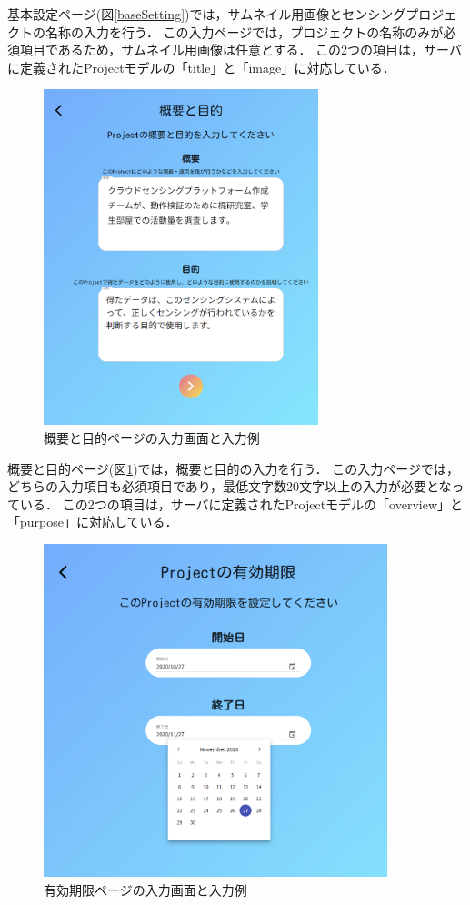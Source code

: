 基本設定ページ(図\ref{baseSetting})では，サムネイル用画像とセンシングプロジェクトの名称の入力を行う．
この入力ページでは，プロジェクトの名称のみが必須項目であるため，サムネイル用画像は任意とする．
この2つの項目は，サーバに定義されたProjectモデルの「title」と「image」に対応している．
\begin{figure}[H]
  \centering
  \includegraphics[width=80mm]{overview.png}
  \caption{概要と目的ページの入力画面と入力例}
  \label{overview}
\end{figure}

概要と目的ページ(図\ref{overview})では，概要と目的の入力を行う．
この入力ページでは，どちらの入力項目も必須項目であり，最低文字数20文字以上の入力が必要となっている．
この2つの項目は，サーバに定義されたProjectモデルの「overview」と「purpose」に対応している．
\begin{figure}[H]
  \centering
  \includegraphics[width=100mm]{period.png}
  \caption{有効期限ページの入力画面と入力例}
  \label{period}
\end{figure}

